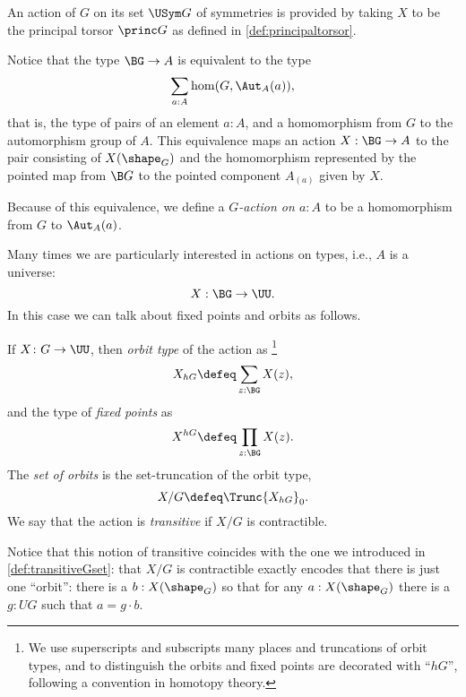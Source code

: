 \begin{example}
  An action of $G$ on its set $\USym G$ of symmetries is provided by taking $X$ to be the principal torsor $\princ G$ as defined in
  \cref{def:principaltorsor}.
\end{example}

Notice that the type $\BG \to A$ is equivalent to the type
\[
  \sum_{a:A}\hom(G,\Aut_A(a)),
\]
that is, the type of pairs of an element $a : A$,
and a homomorphism from $G$ to the automorphism group of $A$.
This equivalence maps an action $X:\BG\to A$ to the pair consisting of $X(\shape_G)$
and the homomorphism represented by the pointed map from $\B G$ to the pointed component $A_{(a)}$ given by $X$.

Because of this equivalence,
we define a \emph{$G$-action on $a:A$}
to be a homomorphism from $G$ to $\Aut_A(a)$.


Many times we are particularly interested in actions on types,
i.e., $A$ is a universe:
\[
  X : \BG \to \UU.
\]
In this case we can talk about fixed points and orbits as follows.
\begin{definition}
  \label{def:orbittype}\label{def:fixedpointtye}
  If $X\colon G\to\UU$, then  \emph{orbit type} of the action as
  \footnote{We use superscripts and subscripts many places and truncations of orbit types, and to distinguish the orbits and fixed points are decorated with ``$hG$'', following a convention in homotopy theory.}
\[
  X_{hG} \defeq \sum_{z:\BG} X(z),
\]
and the type of \emph{fixed points} as
\[
  X^{hG} \defeq \prod_{z:\BG} X(z).
\]
The \emph{set of orbits} is the set-truncation of the orbit type,
\[
  X / G \defeq \Trunc{X_{hG}}_0.
\]
We say that the action is \emph{transitive} if $X / G$ is contractible.
\end{definition}
Notice that this notion of transitive coincides with the one we introduced in \cref{def:transitiveGset}: that $X/G$ is contractible exactly encodes that there is just one ``orbit'': there is a $b:X(\shape_G)$ so that for any $a:X(\shape_G)$ there is a $g:UG$ such that $a=g\cdot b$.



